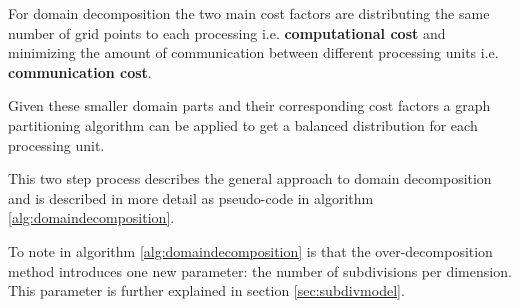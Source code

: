 For domain decomposition the two main cost factors are distributing the same number of grid points to each processing i.e. \textbf{computational cost} and minimizing the amount of communication between different processing units i.e. \textbf{communication cost}.

Given these smaller domain parts and their corresponding cost factors a graph partitioning algorithm can be applied to get a balanced distribution for each processing unit.

This two step process describes the general approach to domain decomposition and is described in more detail as pseudo-code in algorithm \ref{alg:domaindecomposition}.

To note in algorithm \ref{alg:domaindecomposition} is that the over-decomposition method introduces one new parameter: the number of subdivisions per dimension.
This parameter is further explained in section \ref{sec:subdivmodel}.

